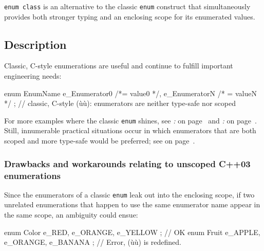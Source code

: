 

\texttt{enum}~\texttt{class} is an alternative to the classic
\texttt{enum} construct that simultaneously provides both stronger
typing and an enclosing scope for its enumerated values.

\subsection[Description]{Description}\label{description-enumclass}

Classic, C-style enumerations are useful and continue to fulfill
important engineering needs:

\begin{emcppslisting}
enum EnumName { e_Enumerator0 /*= value0 */, e_EnumeratorN /* = valueN */ };
    // classic, C-style (ù{}ù): enumerators are neither type-safe nor scoped
\end{emcppslisting}

\noindent For more examples where the classic \texttt{enum} shines, see \textit{: } on page~\pageref{strong-typing-of-an-enum-class-can-be-counterproductive} and \textit{: } on page~\pageref{scoped-enumerations-do-not-necessarily-add-value}. Still,
innumerable practical situations occur in which enumerators that are
both scoped and more type-safe would be preferred; see \textit{} on page~\pageref{introducing-the-c++11-enum-class}.

\subsubsection[Drawbacks and workarounds relating to unscoped C++03 enumerations]{Drawbacks and workarounds relating to unscoped C++03 enumerations}\label{drawbacks-and-workarounds-relating-to-unscoped-c++03-enumerations}

Since the enumerators of a classic \texttt{enum} leak out into the
enclosing scope, if two unrelated enumerations that happen to use the
same enumerator name appear in the same scope, an ambiguity could ensue:

\begin{emcppslisting}
enum Color { e_RED, e_ORANGE, e_YELLOW };    // OK
enum Fruit { e_APPLE, e_ORANGE, e_BANANA };  // Error, (ù{}ù) is redefined.
\end{emcppslisting}


